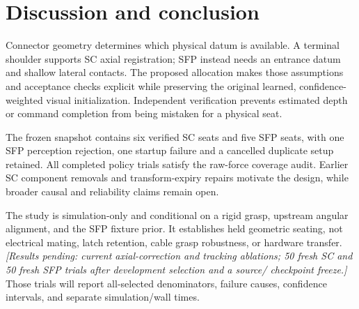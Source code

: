 \documentclass[letterpaper,10pt,conference]{ieeeconf}
\newcommand{\pending}[1]{\textit{[Results pending: #1]}}
\begin{document}
\balance
\section{Discussion and conclusion}
Connector geometry determines which physical datum is available. A terminal
shoulder supports SC axial registration; SFP instead needs an entrance datum
and shallow lateral contacts. The proposed allocation makes those assumptions
and acceptance checks explicit while preserving the original learned,
confidence-weighted visual initialization. Independent verification prevents
estimated depth or command completion from being mistaken for a physical seat.

The frozen snapshot contains six verified SC seats and five SFP seats, with
one SFP perception rejection, one startup failure and a cancelled duplicate
setup retained. All completed
policy trials satisfy the raw-force coverage audit. Earlier SC component
removals and transform-expiry repairs motivate the design, while broader
causal and reliability claims remain open.

The study is simulation-only and conditional on a rigid grasp, upstream
angular alignment, and the SFP fixture prior. It establishes held geometric
seating, not electrical mating, latch retention, cable grasp robustness, or
hardware transfer. \pending{current axial-correction and tracking ablations;
50 fresh SC and 50 fresh SFP trials after development selection and a source/
checkpoint freeze.} Those trials will report all-selected denominators,
failure causes, confidence intervals, and separate simulation/wall times.



\end{document}
